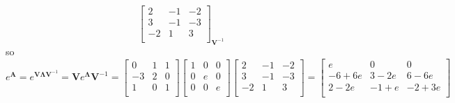 \documentclass[12pt,a4paper]{article}
\begin{document}
\begin{itemize}
\begin{itemize}
\begin{equation}
{\begin{bmatrix}
        2 & -1 & -2 \\
        3 & -1 & -3 \\
        -2 & 1 & 3 \\
      \end{bmatrix}}_{\bm{V}^{-1}}
    \end{equation}
    so
    \begin{equation}
      e^{\bm{A}}
         = e^{\bm{V}\bm{\Lambda}\bm{V}^{-1}}
         = \bm{V}e^{\bm{\Lambda}}\bm{V}^{-1}
         = 
      \begin{bmatrix}
        0 & 1 & 1 \\
        -3 & 2 & 0\\
        1 & 0 & 1 \\
      \end{bmatrix}
      \begin{bmatrix}
        1 & 0 & 0 \\
        0 & e & 0 \\
        0 & 0 & e \\
      \end{bmatrix}
      \begin{bmatrix}
        2 & -1 & -2 \\
        3 & -1 & -3 \\
        -2 & 1 & 3 \\
      \end{bmatrix}
    =
    \begin{bmatrix}
      e & 0 & 0 \\
      -6+6e & 3-2e & 6-6e \\
      2-2e & -1+e & -2+3e \\
    \end{bmatrix}
    \nonumber%
  \end{equation}

  \end{itemize}


\end{itemize}
\end{document}
